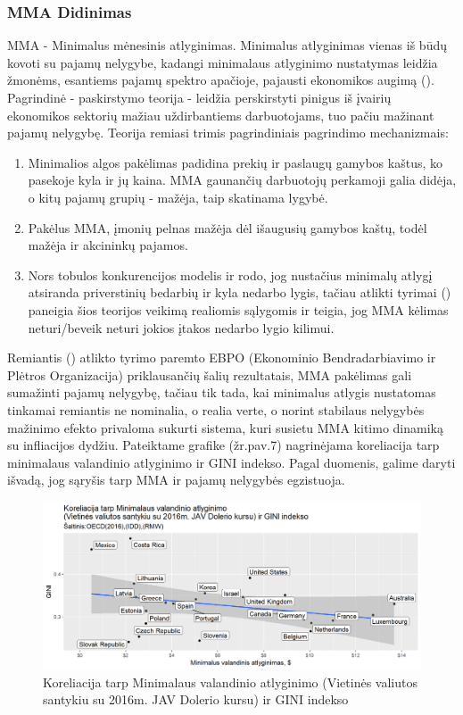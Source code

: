 \documentclass[12pt,a4paper,titlepage]{article}
\begin{document}
\subsubsection{MMA Didinimas}
MMA - Minimalus mėnesinis atlyginimas. Minimalus atlyginimas vienas iš būdų kovoti su pajamų nelygybe, kadangi minimalaus atlyginimo nustatymas leidžia žmonėms, esantiems pajamų spektro apačioje, pajausti ekonomikos augimą (\cite{litwin2015determining}). Pagrindinė - paskirstymo teorija - leidžia perskirstyti pinigus iš įvairių ekonomikos sektorių mažiau uždirbantiems darbuotojams, tuo pačiu mažinant pajamų nelygybę. Teorija remiasi trimis pagrindiniais pagrindimo mechanizmais:
\begin{enumerate}
\item Minimalios algos pakėlimas padidina prekių ir paslaugų gamybos kaštus, ko pasekoje kyla ir jų kaina. MMA gaunančių darbuotojų perkamoji galia didėja, o kitų pajamų grupių - mažėja, taip skatinama lygybė.
\item Pakėlus MMA, įmonių pelnas mažėja dėl išaugusių gamybos kaštų, todėl mažėja ir akcininkų pajamos.
\item Nors tobulos konkurencijos modelis ir rodo, jog nustačius minimalų atlygį atsiranda priverstinių bedarbių ir kyla nedarbo lygis, tačiau atlikti tyrimai (\cite{cengiz2019effect}) paneigia šios teorijos veikimą realiomis sąlygomis ir teigia, jog MMA kėlimas neturi/beveik neturi jokios įtakos nedarbo lygio kilimui. 
\end{enumerate}
Remiantis (\cite{litwin2015determining}) atlikto tyrimo paremto EBPO (Ekonominio Bendradarbiavimo ir Plėtros Organizacija) priklausančių šalių rezultatais, MMA pakėlimas gali sumažinti pajamų nelygybę, tačiau tik tada, kai minimalus atlygis nustatomas tinkamai remiantis ne nominalia, o realia verte, o norint stabilaus nelygybės mažinimo efekto privaloma sukurti sistema, kuri susietu MMA kitimo dinamiką su infliacijos dydžiu.
Pateiktame grafike (žr.pav.7) nagrinėjama koreliacija tarp minimalaus valandinio atlyginimo ir GINI indekso. Pagal duomenis, galime daryti išvadą, jog sąryšis tarp MMA ir pajamų nelygybės egzistuoja. 
\begin{figure}[H]
\includegraphics[scale=0.7]{koreliacija.png}
\caption{Koreliacija tarp Minimalaus valandinio atlyginimo (Vietinės valiutos santykiu su 2016m. JAV Dolerio kursu) ir GINI indekso}
\end{figure}
\end{document}
